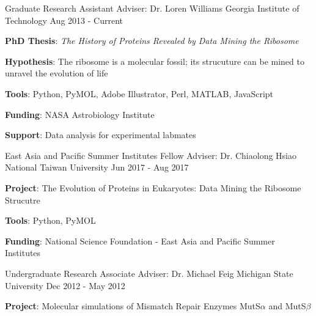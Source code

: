 

\begin{cventries}

  \cventry
    {Graduate Research Assistant} %
    {Adviser: Dr. Loren Williams} %
    {Georgia Institute of Technology} %
    {Aug 2013 - Current} %
    {{\textbf{PhD Thesis}: \textit{The History of Proteins Revealed by Data Mining the Ribosome}}
      \begin{cvitems} %
      \vspace{4.0mm}
        \item {\textbf{Hypothesis}: The ribosome is a molecular fossil; its strucuture can be mined to unravel the evolution of life}
        \item {\textbf{Tools}: Python, PyMOL, Adobe Illustrator, Perl, MATLAB, JavaScript}
        \item {\textbf{Funding}: NASA Astrobiology Institute}
        \item {\textbf{Support}: Data analysis for experimental labmates}
      \end{cvitems}
    }
    
  \cventry
    {East Asia and Pacific Summer Institutes Fellow} %
    {Adviser: Dr. Chiaolong Hsiao} %
    {National Taiwan University} %
    {Jun 2017 - Aug 2017} %
    {
      \begin{cvitems} %
      	\item {\textbf{Project}: The Evolution of Proteins in Eukaryotes: Data Mining the Ribosome Strucutre}
        \item {\textbf{Tools}: Python, PyMOL}
        \item {\textbf{Funding}: National Science Foundation - East Asia and Pacific Summer Institutes}
      \end{cvitems}
    }
    
  \cventry
    {Undergraduate Research Associate} %
    {Adviser: Dr. Michael Feig} %
    {Michigan State University} %
    {Dec 2012 - May 2012} %
    {
      \begin{cvitems} %
        \item {\textbf{Project}: Molecular simulations of Mismatch Repair Enzymes MutS$\alpha$ and MutS$\beta$}
      \end{cvitems}
    }


\end{cventries}
